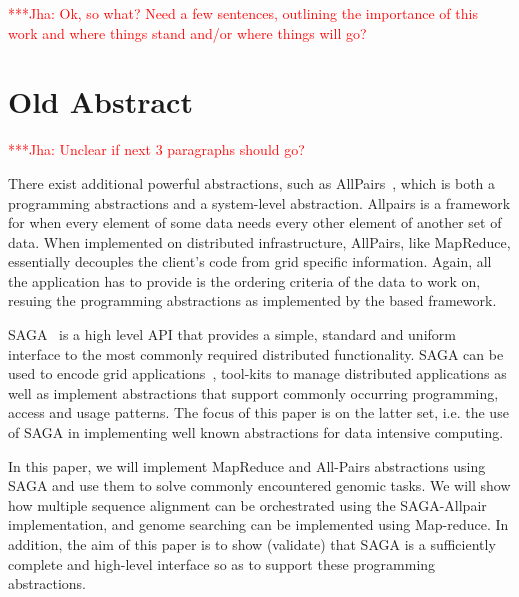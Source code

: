 \documentclass[a4paper,11pt]{article} \usepackage[utf8]{inputenc}
\newcommand{\jhanote}[1]{ {\textcolor{red} { ***Jha: #1 }}}
\newcommand{\yyenote}[1]{ {\textcolor{blue} { ***yye00: #1 }}} \else
\newcommand{\jhanote}[1]{} \newcommand{\yyenote}[1]{}
\begin{document}
\jhanote{Ok, so what? Need a few sentences, outlining the importance of
this work and where things stand and/or where things will go?}

\section{Old Abstract}


\jhanote{Unclear if next 3 paragraphs should go?}

There exist additional powerful abstractions, such as
AllPairs~\cite{allpairs}, which is both a programming abstractions and a
system-level abstraction.  Allpairs is a framework for when every
element of some data needs every other element of another set of data.
When implemented on distributed infrastructure, AllPairs, like
MapReduce, essentially decouples the client's code from grid specific
information.  Again, all the application has to provide is the ordering
criteria of the data to work on, resuing the programming abstractions as
implemented by the based framework.

SAGA~\cite{saga_gfd90} is a high level API that provides a simple,
standard and uniform interface to the most commonly required distributed
functionality.  SAGA can be used to encode grid
applications~\cite{saga_escience07, saga_tg08}, tool-kits to manage
distributed applications as well as implement abstractions that support
commonly occurring programming, access and usage patterns.  The focus of
this paper is on the latter set, i.e.  the use of SAGA in implementing
well known abstractions for data intensive computing.  

In this paper, we will implement MapReduce and All-Pairs abstractions
using SAGA and use them to solve commonly encountered genomic tasks.  We
will show how multiple sequence alignment can be orchestrated using the
SAGA-Allpair implementation, and genome searching can be implemented
using Map-reduce.  In addition, the aim of this paper is to show
(validate) that SAGA is a sufficiently complete and high-level interface
so as to support these programming abstractions.
\end{document}
